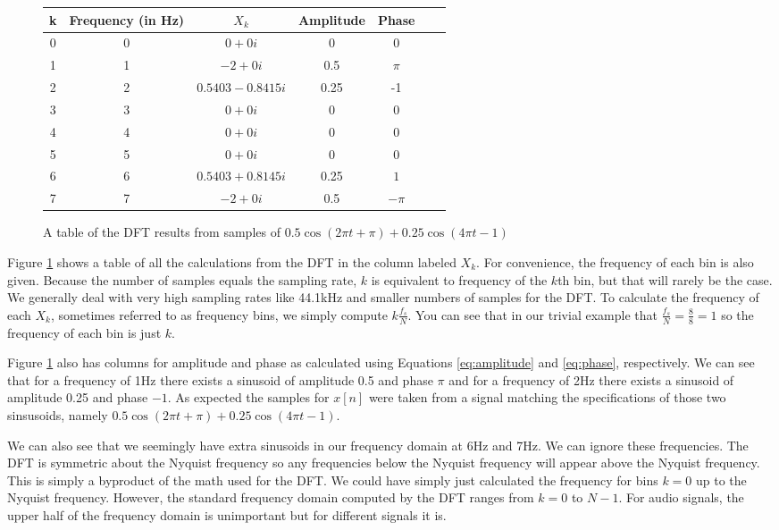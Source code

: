 \begin{figure}[h] 
	\caption{A table of the DFT results from samples of $0.5\cos(2\pi t + \pi) + 0.25\cos(4\pi t - 1)$}
	\label{fig:dftTable}
	\begin{center}
		\begin{tabular}{ |c|c|c|c|c|c|c| } 
			\hline
			k & Frequency (in Hz) & $X_k$ & Amplitude & Phase \\ 
			\hline
			0 & 0 & $0 + 0i$ & 0 & 0 \\ 
			1 & 1 & $-2 + 0i$ & 0.5 & $\pi$ \\
			2 & 2 & $0.5403 - 0.8415i$ &0.25 & -1 \\
			3 & 3 & $0 + 0i$& 0 & 0 \\
			4 & 4 & $0 + 0i$  & 0 & 0 \\
			5 & 5 & $0 + 0i$  & 0 & 0 \\
			6 & 6 & $0.5403 + 0.8145i$ & 0.25 & $1$ \\
			7 & 7 & $-2 + 0i$  & 0.5 & $-\pi$ \\
			\hline
		\end{tabular}
	\end{center}
	
\end{figure}

Figure \ref{fig:dftTable} shows a table of all the calculations from the DFT in the column labeled $X_k$.  For
convenience, the frequency of each bin is also given.  Because the number of samples equals the sampling rate,
$k$ is equivalent to frequency of the $k$th bin, but that will rarely be the case.  We generally deal with very high
sampling rates like 44.1kHz and smaller numbers of samples for the DFT.  To calculate the frequency of each
$X_k$, sometimes referred to as frequency bins, we simply compute $k\frac{f_s}{N}$.  You can see that in
our trivial example that $\frac{f_s}{N} = \frac{8}{8} = 1$ so the frequency of each bin is just $k$.

Figure \ref{fig:dftTable} also has  columns for amplitude and phase as calculated using Equations 
\ref{eq:amplitude} and \ref{eq:phase},
respectively.  We can see that for a frequency of 1Hz there exists
 a sinusoid of amplitude 0.5 and phase $\pi$ and for a frequency of 2Hz there exists a sinusoid of 
 amplitude 0.25 and phase $-1$.  As expected the samples for $x[n]$ were taken from a signal 
 matching the specifications of those two sinsusoids, namely $0.5\cos(2\pi t + \pi) + 0.25\cos(4\pi t - 1)$.
 
 We can also see that we seemingly have extra sinusoids in our frequency domain at 6Hz and 7Hz.  
 We can ignore these frequencies.  The DFT is symmetric about the Nyquist frequency so any 
 frequencies below the Nyquist frequency will appear above the Nyquist frequency.  This is simply
 a byproduct of the math used for the DFT.  We could have simply just calculated the frequency
 for bins $k = 0$ up to the Nyquist frequency.  However, the standard frequency domain computed
 by the DFT ranges from $k = 0$ to $N - 1$.  For audio signals, the upper half of the frequency
 domain is unimportant but for different signals it is.
 
